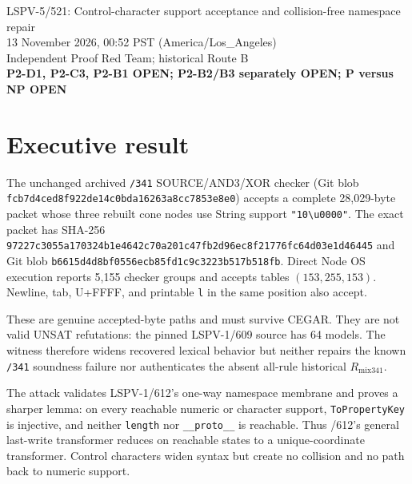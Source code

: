 \documentclass[11pt]{article}
\begin{document}
\begin{center}
{\Large LSPV-5/521: Control-character support acceptance and collision-free namespace repair}\\[4pt]
13 November 2026, 00:52 PST (America/Los\_Angeles)\\
Independent Proof Red Team; historical Route B\\
\textbf{P2-D1, P2-C3, P2-B1 OPEN; P2-B2/B3 separately OPEN; P versus NP OPEN}
\end{center}

\section*{Executive result}
The unchanged archived \texttt{/341} SOURCE/AND3/XOR checker (Git blob
\texttt{fcb7d4ced8f922de14c0bda16263a8cc7853e8e0}) accepts a complete
28,029-byte packet whose three rebuilt cone nodes use String support
\verb|"10\u0000"|.  The exact packet has SHA-256
\texttt{97227c3055a170324b1e4642c70a201c47fb2d96ec8f21776fc64d03e1d46445}
and Git blob \texttt{b6615d4d8bf0556ecb85fd1c9c3223b517b518fb}.
Direct Node OS execution reports 5,155 checker groups and accepts tables
$(153,255,153)$.  Newline, tab, U+FFFF, and printable \texttt{l} in the same
position also accept.

These are genuine accepted-byte paths and must survive CEGAR.  They are not
valid UNSAT refutations: the pinned LSPV-1/609 source has 64 models.  The
witness therefore widens recovered lexical behavior but neither repairs the
known \texttt{/341} soundness failure nor authenticates the absent all-rule
historical $R_{\mathrm{mix341}}$.

The attack validates LSPV-1/612's one-way namespace membrane and proves a
sharper lemma: on every reachable numeric or character support,
\texttt{ToPropertyKey} is injective, and neither \texttt{length} nor
\texttt{\_\_proto\_\_} is reachable.  Thus /612's general last-write
transformer reduces on reachable states to a unique-coordinate transformer.
Control characters widen syntax but create no collision and no path back to
numeric support.
\end{document}
